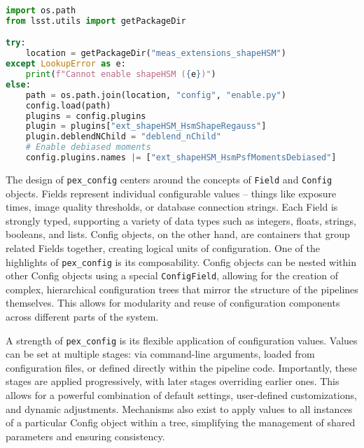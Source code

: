 \begin{minipage}{\columnwidth}
    \begin{lstlisting}[caption=Code configuration in python, language=python]
import os.path
from lsst.utils import getPackageDir

try:
    location = getPackageDir("meas_extensions_shapeHSM")
except LookupError as e:
    print(f"Cannot enable shapeHSM ({e})")
else:
    path = os.path.join(location, "config", "enable.py")
    config.load(path)
    plugins = config.plugins
    plugin = plugins["ext_shapeHSM_HsmShapeRegauss"]
    plugin.deblendNChild = "deblend_nChild"
    # Enable debiased moments
    config.plugins.names |= ["ext_shapeHSM_HsmPsfMomentsDebiased"]
    \end{lstlisting}
\end{minipage}

The design of \texttt{pex\_config} centers around the concepts of \texttt{Field} and \texttt{Config} objects.
Fields represent individual configurable values -- things like exposure times, image quality thresholds, or database connection strings.
Each Field is strongly typed, supporting a variety of data types such as integers, floats, strings, booleans, and lists.
Config objects, on the other hand, are containers that group related Fields together, creating logical units of configuration.
One of the highlights of \texttt{pex\_config} is its composability.
Config objects can be nested within other Config objects using a special \texttt{ConfigField}, allowing for the creation of complex, hierarchical configuration trees that mirror the structure of the pipelines themselves.
This allows for modularity and reuse of configuration components across different parts of the system.

A strength of \texttt{pex\_config} is its flexible application of configuration values.
Values can be set at multiple stages: via command-line arguments, loaded from configuration files, or defined directly within the pipeline code.
Importantly, these stages are applied progressively, with later stages overriding earlier ones.
This allows for a powerful combination of default settings, user-defined customizations, and dynamic adjustments.
Mechanisms also exist to apply values to all instances of a particular Config object within a tree, simplifying the management of shared parameters and ensuring consistency.


